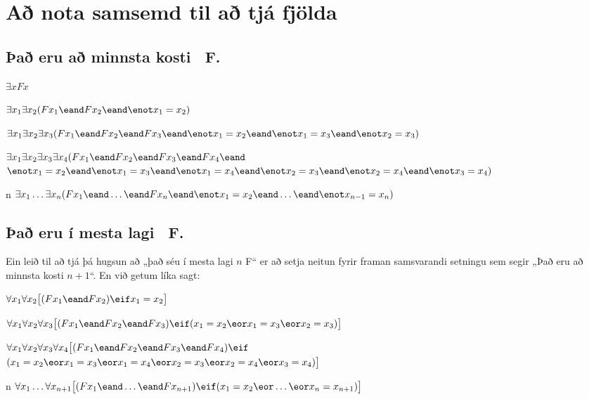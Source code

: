
\newpage
\section{Að nota samsemd til að tjá fjölda}

\subsection*{Það eru að minnsta kosti \blank\ F.}
\label{summary.atleast}

\begin{ekey}
\item[\text{eitt}] $\exists xFx$
\item[\text{tvö}] $\exists x_1\exists x_2(Fx_1 \eand Fx_2 \eand \enot x_1  = x_2)$
\item[\text{þrjú}] $\exists x_1\exists x_2\exists x_3(Fx_1 \eand Fx_2 \eand Fx_3 \eand \enot x_1 = x_2 \eand\enot x_1 = x_3 \eand \enot x_2 = x_3)$
\item[\text{fjögur}] $\exists x_1\exists x_2\exists x_3\exists x_4 (Fx_1 \eand Fx_2 \eand Fx_3 \eand Fx_4 \eand \phantom{x}$\\
\phantom{$\exists x_1\exists x_2$}$\enot x_1 = x_2 \eand \enot x_1 = x_3 \eand \enot x_1 = x_4 \eand \enot x_2 = x_3 \eand \enot x_2 = x_4 \eand \enot x_3 = x_4)$
\item[n] $\exists x_1\ldots\exists x_n(Fx_1 \eand\ldots\eand Fx_n \eand \enot x_1 = x_2 \eand\ldots\eand \enot x_{n-1} = x_n)$ 
\end{ekey}

\subsection*{Það eru í mesta lagi \blank\ F.}
\label{summary.atmost}

Ein leið til að tjá þá hugsun að „það séu í mesta lagi $n$ F“ er að setja neitun fyrir framan samsvarandi setningu sem segir „Það eru að minnsta kosti $n+1$“. En við getum líka sagt: 

\begin{ekey}
\item[\text{eitt}] $\forall x_1\forall x_2\bigl[(Fx_1 \eand Fx_2) \eif x_1=x_2\bigr]$
\item[\text{tvö}] $\forall x_1\forall x_2\forall x_3\bigl[(Fx_1 \eand Fx_2 \eand Fx_3) \eif (x_1=x_2 \eor x_1=x_3 \eor x_2=x_3)\bigr]$
\item[\text{þrjú}] $\forall x_1\forall x_2\forall x_3\forall x_4\bigl[(Fx_1 \eand Fx_2 \eand Fx_3 \eand Fx_4) \eif \phantom{.}$\\
\phantom{$\exists x_1 \exists x_2$}$(x_1=x_2 \eor x_1=x_3 \eor x_1=x_4 \eor x_2=x_3 \eor x_2=x_4 \eor x_3=x_4)\bigr]$
\item[n]$\forall x_1\ldots\forall x_{n+1}
\bigl[(Fx_1\eand \ldots \eand Fx_{n+1}) \eif (x_1=x_2 \eor \ldots \eor x_n=x_{n+1})\bigr]$ 
\end{ekey}

